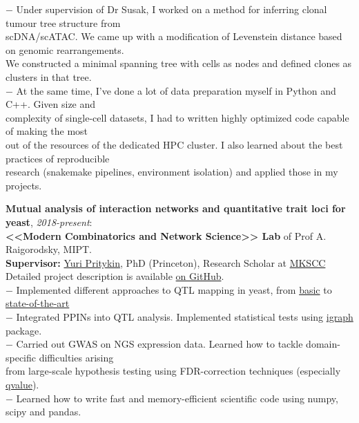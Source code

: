 \documentclass[11pt]{res}
\begin{document}
\begin{resume}
$ - $ Under supervision of Dr Susak, I worked on a method for inferring clonal tumour tree structure from 
\\\hphantom{—} scDNA/scATAC. We came up with a modification of Levenstein distance based on genomic rearrangements.\\\hphantom{—} We constructed a minimal spanning tree with cells as nodes and defined clones as clusters in that tree.\\
$ - $ At the same time, I've done a lot of data preparation myself in Python and C++. Given size and \\\hphantom{—} complexity of single-cell datasets, I had to written highly optimized code capable of making the most \\\hphantom{—} out of the resources of the dedicated HPC cluster. I also learned about the best practices of reproducible \\\hphantom{—} research (snakemake pipelines, environment isolation) and applied those in my projects.
\par 
\textbf{Mutual analysis of interaction networks and quantitative trait loci for yeast}, \textit{2018-present}:\\
\textbf{<<Modern Combinatorics and Network Science>> Lab} of Prof A. Raigorodsky, MIPT.\\
\textbf{Supervisor:} \href{https://scholar.google.com/citations?hl=en&user=Arx56RkJBrYC&view_op=list_works&sortby=pubdate}{Yuri Pritykin}, PhD (Princeton), Research Scholar at \href{https://www.mskcc.org/}{MKSCC}\\
Detailed project description is available \href{https://github.com/ivanov-v-v/eQTL_analysis}{on GitHub}.\vspace{0.2em}\\
$ - $ Implemented different approaches to QTL mapping in yeast, from \href{https://www.ncbi.nlm.nih.gov/pubmed/11923494}{basic} to \href{https://elifesciences.org/articles/35471}{state-of-the-art}\\
$ - $ Integrated PPINs into QTL analysis. Implemented statistical tests using \href{http://igraph.org/redirect.html}{igraph} package.\\
$ - $ Carried out GWAS on NGS expression data. Learned how to tackle domain-specific difficulties arising\\ \hphantom{—} from large-scale hypothesis testing using FDR-correction techniques (especially \href{https://github.com/StoreyLab/qvalue}{qvalue}).\\
$ - $ Learned how to write fast and memory-efficient scientific code using numpy, scipy and pandas.\\

\end{resume}
\end{document}
